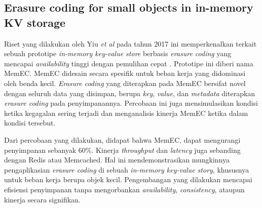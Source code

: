 \subsection{Erasure coding for small objects in in-memory KV storage}

Riset yang dilakukan oleh Yiu \textit{et al} pada tahun 2017 ini memperkenalkan terkait sebuah prototipe \textit{in-memory key-value store} berbasis \textit{erasure coding} yang mencapai \textit{availability} tinggi dengan pemulihan cepat \parencite{yiu2017erasure}. Prototipe ini diberi nama MemEC. MemEC didesain secara spesifik untuk beban kerja yang didominasi oleh benda kecil. \textit{Erasure coding} yang diterapkan pada MemEC bersifat novel dengan seluruh data yang disimpan, berupa \textit{key}, \textit{value}, dan \textit{metadata} diterapkan \textit{erasure coding} pada penyimpanannya. Percobaan ini juga mensimulasikan kondisi ketika kegagalan sering terjadi dan menganalisis kinerja MemEC ketika dalam kondisi tersebut.

Dari percobaan yang dilakukan, didapat bahwa MemEC, dapat mengurangi penyimpanan sebanyak 60\%. Kinerja \textit{throughput} dan \textit{latency} juga sebanding dengan Redis atau Memcached. Hal ini mendemonstrasikan mungkinnya pengaplikasian \textit{erasure coding} di sebuah \textit{in-memory key-value story}, khususnya untuk beban kerja berupa objek kecil. Pengembangan yang dilakukan mencapai efisiensi penyimpanan tanpa mengorbankan \textit{availability}, \textit{consistency}, ataupun kinerja secara signifikan.
